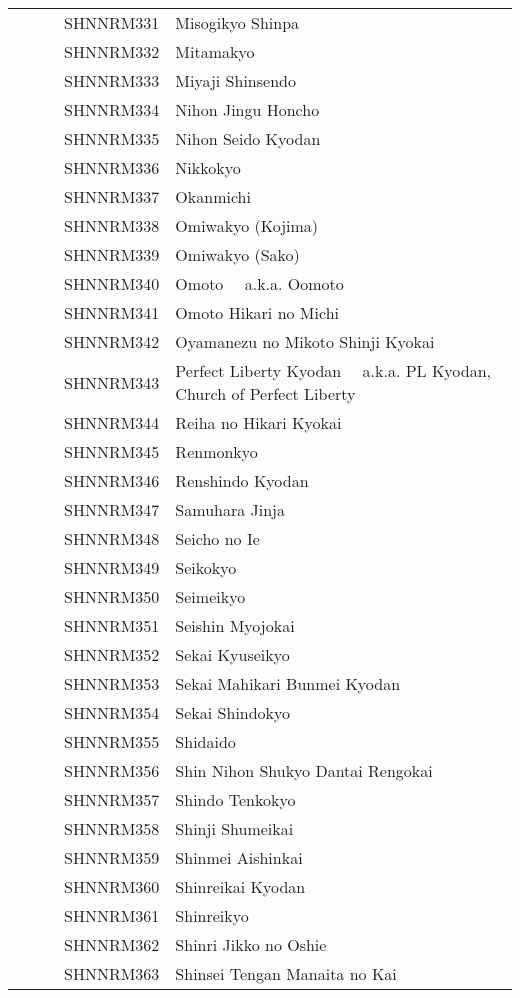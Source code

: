 \documentclass[12pt]{article}
\begin{document}
\begin{tiny}
\begin{center}
\begin{longtable}{|l|l|}
~~~~~~SHNNRM331 & Misogikyo Shinpa \\
~~~~~~SHNNRM332 & Mitamakyo \\
~~~~~~SHNNRM333 & Miyaji Shinsendo \\
~~~~~~SHNNRM334 & Nihon Jingu Honcho \\
~~~~~~SHNNRM335 & Nihon Seido Kyodan \\
~~~~~~SHNNRM336 & Nikkokyo \\
~~~~~~SHNNRM337 & Okanmichi \\
~~~~~~SHNNRM338 & Omiwakyo (Kojima) \\
~~~~~~SHNNRM339 & Omiwakyo (Sako) \\
~~~~~~SHNNRM340 & Omoto	~~a.k.a. Oomoto \\
~~~~~~SHNNRM341 & Omoto Hikari no Michi \\
~~~~~~SHNNRM342 & Oyamanezu no Mikoto Shinji Kyokai \\
~~~~~~SHNNRM343 & Perfect Liberty Kyodan	~~a.k.a. PL Kyodan, Church of Perfect Liberty \\
~~~~~~SHNNRM344 & Reiha no Hikari Kyokai \\
~~~~~~SHNNRM345 & Renmonkyo \\
~~~~~~SHNNRM346 & Renshindo Kyodan \\
~~~~~~SHNNRM347 & Samuhara Jinja \\
~~~~~~SHNNRM348 & Seicho no Ie \\
~~~~~~SHNNRM349 & Seikokyo \\
~~~~~~SHNNRM350 & Seimeikyo \\
~~~~~~SHNNRM351 & Seishin Myojokai \\
~~~~~~SHNNRM352 & Sekai Kyuseikyo \\
~~~~~~SHNNRM353 & Sekai Mahikari Bunmei Kyodan \\
~~~~~~SHNNRM354 & Sekai Shindokyo \\
~~~~~~SHNNRM355 & Shidaido \\
~~~~~~SHNNRM356 & Shin Nihon Shukyo Dantai Rengokai \\
~~~~~~SHNNRM357 & Shindo Tenkokyo \\
~~~~~~SHNNRM358 & Shinji Shumeikai \\
~~~~~~SHNNRM359 & Shinmei Aishinkai \\
~~~~~~SHNNRM360 & Shinreikai Kyodan \\
~~~~~~SHNNRM361 & Shinreikyo \\
~~~~~~SHNNRM362 & Shinri Jikko no Oshie \\
~~~~~~SHNNRM363 & Shinsei Tengan Manaita no Kai \\

\end{longtable}
\end{center}
\end{tiny}
\end{document}
